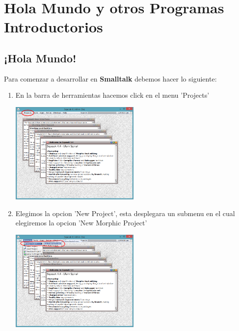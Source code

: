 \documentclass[11pt]{article}
\begin{document}
\section{\textbf{Hola Mundo y otros Programas Introductorios}}
\subsection{\textbf{¡Hola Mundo!}}
Para comenzar a desarrollar en \textbf{Smalltalk} debemos hacer lo siguiente:
\begin{enumerate}
\item
En la barra de herramientas hacemos click en el menu 'Projects'
				\begin{center}
				\includegraphics[width=0.5\textwidth]{images/barra_herramientas}
				\end{center}

\item
Elegimos la opcion 'New Project', esta desplegara un submenu en el cual elegiremos la opcion 'New Morphic Project'
				\begin{center}
				\includegraphics[width=0.5\textwidth]{images/new_project}
				\end{center}


\end{enumerate}
\end{document}
